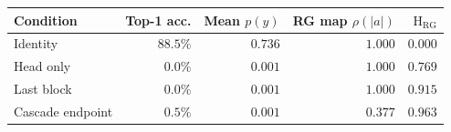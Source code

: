 \begin{tabular}{lrrrr}
\toprule
Condition & Top-1 acc. & Mean $p(y)$ & RG map $\rho(|a|)$ & $\mathrm{H}_{\mathrm{RG}}$ \\
\midrule
Identity & $88.5\%$ & $0.736$ & $1.000$ & $0.000$ \\
Head only & $0.0\%$ & $0.001$ & $1.000$ & $0.769$ \\
Last block & $0.0\%$ & $0.001$ & $1.000$ & $0.915$ \\
Cascade endpoint & $0.5\%$ & $0.001$ & $0.377$ & $0.963$ \\
\bottomrule
\end{tabular}
